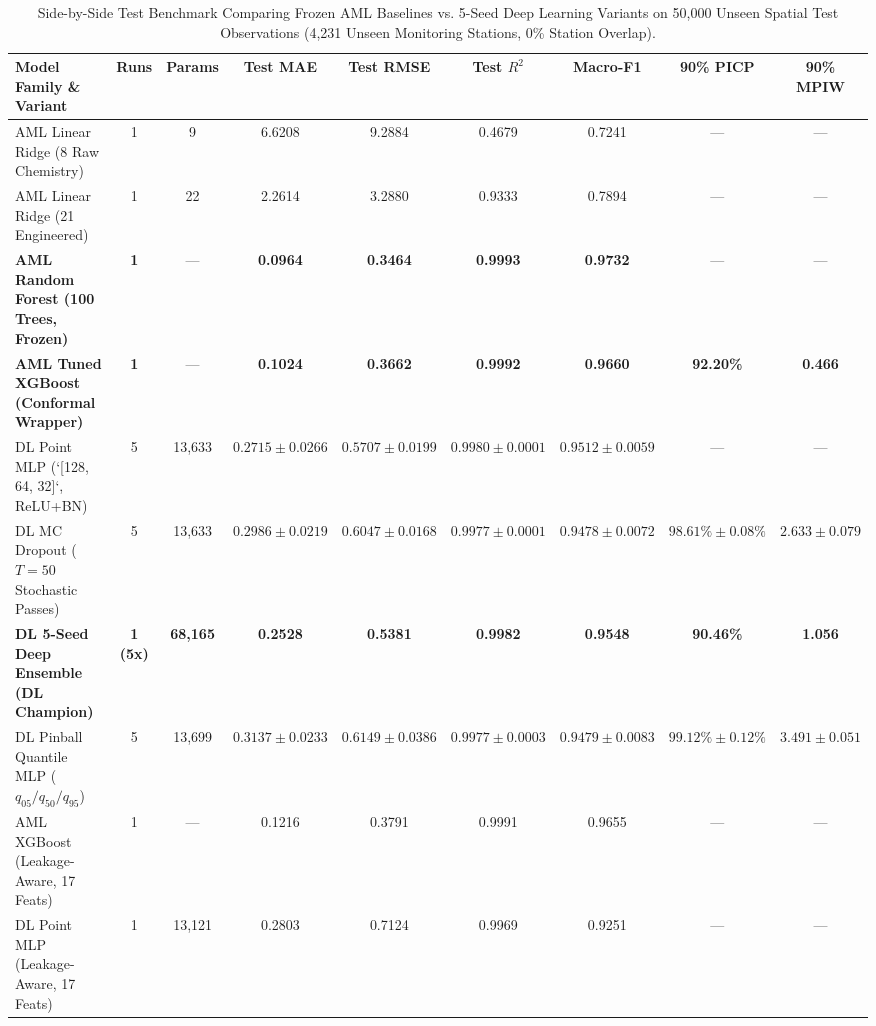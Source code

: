 \documentclass[journal,10pt,twocolumn]{IEEEtran}
\begin{document}
\begin{table}[!t]
\centering
\caption{Side-by-Side Test Benchmark Comparing Frozen AML Baselines vs. 5-Seed Deep Learning Variants on 50,000 Unseen Spatial Test Observations (4,231 Unseen Monitoring Stations, 0\% Station Overlap).}
\label{tab:main_comparison}
\begin{tabular}{lcccccccc}
\toprule
\textbf{Model Family \& Variant} & \textbf{Runs} & \textbf{Params} & \textbf{Test MAE} & \textbf{Test RMSE} & \textbf{Test $R^2$} & \textbf{Macro-F1} & \textbf{90\% PICP} & \textbf{90\% MPIW} \\
\midrule
AML Linear Ridge (8 Raw Chemistry) & 1 & 9 & 6.6208 & 9.2884 & 0.4679 & 0.7241 & --- & --- \\
AML Linear Ridge (21 Engineered) & 1 & 22 & 2.2614 & 3.2880 & 0.9333 & 0.7894 & --- & --- \\
\textbf{AML Random Forest (100 Trees, Frozen)} & \textbf{1} & --- & \textbf{0.0964} & \textbf{0.3464} & \textbf{0.9993} & \textbf{0.9732} & --- & --- \\
\textbf{AML Tuned XGBoost (Conformal Wrapper)} & \textbf{1} & --- & \textbf{0.1024} & \textbf{0.3662} & \textbf{0.9992} & \textbf{0.9660} & \textbf{92.20\%} & \textbf{0.466} \\
\midrule
DL Point MLP (`[128, 64, 32]`, ReLU+BN) & 5 & 13,633 & $0.2715 \pm 0.0266$ & $0.5707 \pm 0.0199$ & $0.9980 \pm 0.0001$ & $0.9512 \pm 0.0059$ & --- & --- \\
DL MC Dropout ($T=50$ Stochastic Passes) & 5 & 13,633 & $0.2986 \pm 0.0219$ & $0.6047 \pm 0.0168$ & $0.9977 \pm 0.0001$ & $0.9478 \pm 0.0072$ & $98.61\% \pm 0.08\%$ & $2.633 \pm 0.079$ \\
\textbf{DL 5-Seed Deep Ensemble (DL Champion)} & \textbf{1 (5x)} & \textbf{68,165} & \textbf{0.2528} & \textbf{0.5381} & \textbf{0.9982} & \textbf{0.9548} & \textbf{90.46\%} & \textbf{1.056} \\
DL Pinball Quantile MLP ($q_{05}/q_{50}/q_{95}$) & 5 & 13,699 & $0.3137 \pm 0.0233$ & $0.6149 \pm 0.0386$ & $0.9977 \pm 0.0003$ & $0.9479 \pm 0.0083$ & $99.12\% \pm 0.12\%$ & $3.491 \pm 0.051$ \\
\midrule
AML XGBoost (Leakage-Aware, 17 Feats) & 1 & --- & 0.1216 & 0.3791 & 0.9991 & 0.9655 & --- & --- \\
DL Point MLP (Leakage-Aware, 17 Feats) & 1 & 13,121 & 0.2803 & 0.7124 & 0.9969 & 0.9251 & --- & --- \\
\bottomrule
\end{tabular}
\end{table}
\end{document}
